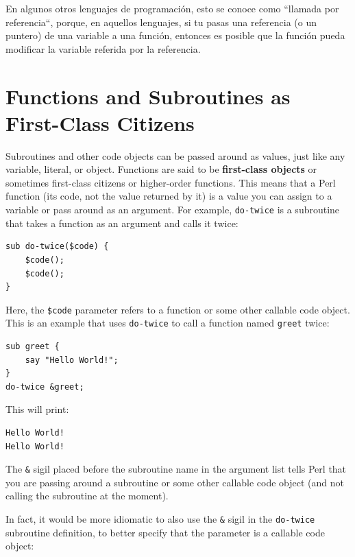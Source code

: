 En algunos otros lenguajes de programación, esto se conoce como
``llamada por referencia``, porque, en aquellos lenguajes, 
si tu pasas una referencia (o un puntero) de una variable a una
función, entonces es posible que la función pueda modificar la
variable referida por la referencia.


\section{Functions and Subroutines as First-Class Citizens}
\label{first_class}

Subroutines and other code objects can be passed around as values, 
just like any variable, literal, or object. Functions are said 
to be {\bf first-class objects} or sometimes first-class 
citizens or higher-order functions. This means that a Perl 
function (its code, not the value returned by it) is a value 
you can assign to a variable or pass around as an argument. 
For example, \verb"do-twice" is a subroutine that takes a 
function as an argument and calls it twice:

\begin{verbatim}
sub do-twice($code) {
    $code(); 
    $code();
}
\end{verbatim}

Here, the \verb"$code" parameter refers to a function or some
other callable code object. This is an example that uses
\verb"do-twice" to call a function named \verb"greet" twice:

\begin{verbatim}
sub greet {
    say "Hello World!";
}
do-twice &greet;
\end{verbatim}

This will print:
\begin{verbatim}
Hello World!
Hello World!
\end{verbatim}

The \verb"&" sigil placed before the subroutine name in the 
argument list tells Perl that you are passing around a 
subroutine or some other callable code object (and not 
calling the subroutine at the moment).

In fact, it would be more idiomatic to also use the \verb"&" 
sigil in the \verb"do-twice" subroutine definition, to better 
specify that the parameter is a callable code object:

